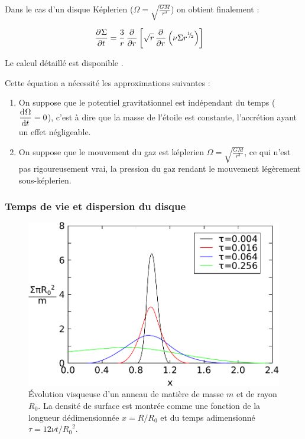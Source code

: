 Dans le cas d'un disque Képlerien ($\Omega = \sqrt{\frac{GM}{r^3}}$) on obtient finalement :
\begin{important}
\begin{align}
\mathinner{ \dfrac{\partial{^{}}\Sigma}{\partial{{t}^{}}} } &=\frac{3}{r}\mathinner{ \dfrac{\partial{^{}}}{\partial{{r}^{}}} }\left[\sqrt{r} \mathinner{ \dfrac{\partial{^{}}}{\partial{{r}^{}}} }\left(\nu \Sigma r^{{}^{1\!\!}/ _{\!2}}\right)\right]
\end{align}
\end{important}

Le calcul détaillé est disponible .

Cette équation a nécessité les approximations suivantes : 
\begin{enumerate}
\item On suppose que le potentiel gravitationnel est indépendant du temps ($\mathinner{ \dfrac{\operatorname{d \!}{^{}}\Omega}{\operatorname{d \!}{{t}^{}}} }=0$), c'est à dire que la masse de l'étoile est constante, l'accrétion ayant un effet négligeable.
\item On suppose que le mouvement du gaz est képlerien $\Omega=\sqrt{\frac{GM}{r^3}}$, ce qui n'est pas rigoureusement vrai, la pression du gaz rendant le mouvement légèrement sous-képlerien.
\end{enumerate}

\subsubsection{Temps de vie et dispersion du disque}\label{sec:dispersion}

\begin{figure}[htbp]
\centering
\includegraphics[width=0.65\linewidth]{figure/pringle_viscous_dissipation.pdf}
\caption{Évolution visqueuse d'un anneau de matière de masse $m$ et de rayon $R_0$. La densité de surface est montrée comme une fonction de la longueur dédimensionnée $x=R/R_0$ et du temps adimensionné $\tau=12\nu t / {R_0}^2$.}\label{fig:pringle_viscous_dissipation}
\end{figure}

